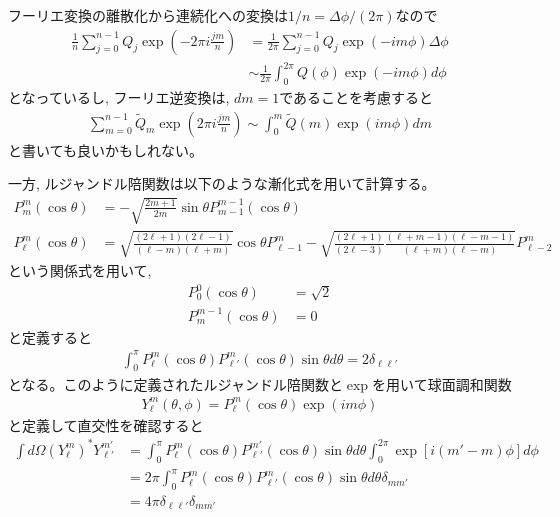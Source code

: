 \documentclass[a4j, 12pt]{ltjarticle}
\begin{document}
    フーリエ変換の離散化から連続化への変換は$1/n = \Delta \phi/(2\pi)$なので
    \begin{align}
        \frac{1}{n}\sum_{j=0}^{n-1}Q_j \exp\left(-2\pi i \frac{jm}{n}\right)
        &= \frac{1}{2\pi}\sum_{j=0}^{n-1}Q_j\exp\left(-im\phi \right) \Delta \phi \\
        &\sim \frac{1}{2\pi}\int_0^{2\pi} Q(\phi) \exp(-im\phi)d\phi
    \end{align}
    となっているし, フーリエ逆変換は, $dm = 1$であることを考慮すると
    \begin{align}
        \sum_{m=0}^{n-1}\tilde{Q}_m\exp\left(2\pi i \frac{jm}{n}\right) \sim
        \int_0^m \tilde{Q}(m) \exp\left(im\phi\right) dm
    \end{align}
    と書いても良いかもしれない。
    \par
    一方, ルジャンドル陪関数は以下のような漸化式を用いて計算する。
    \begin{align}
        P^m_m(\cos\theta) &= -\sqrt{\frac{2m+1}{2m}}\sin\theta P_{m-1}^{m-1}(\cos\theta) \\
        P^m_\ell (\cos\theta) &= \sqrt{\frac{(2\ell+1)(2\ell-1)}{(\ell - m)(\ell + m)}}\cos\theta P_{\ell-1}^m
        - \sqrt{\frac{(2\ell+1)}{(2\ell-3)}\frac{(\ell + m - 1)(\ell - m - 1)}{(\ell + m)(\ell - m)}}P_{\ell-2}^m
    \end{align}
    という関係式を用いて, 
    \begin{align}
        P_0^0(\cos\theta) &= \sqrt{2}\\
        P_m^{m-1}(\cos\theta) &= 0
    \end{align}
    と定義すると
    \begin{align}
        \int_0^\pi P_\ell^m(\cos\theta)P_{\ell'}^m(\cos\theta) \sin\theta d\theta = 2\delta_{\ell\ell'}
    \end{align}
    となる。このように定義されたルジャンドル陪関数と$\exp$を用いて球面調和関数
    \begin{align}
        Y_\ell^m(\theta,\phi) = P_\ell^m (\cos\theta)\exp(im\phi)
    \end{align}
    と定義して直交性を確認すると
    \begin{align}
        \int d\Omega (Y_\ell^m)^* Y_{\ell'}^{m'} &=
        \int_0^{\pi} P_\ell^m(\cos\theta)P_{\ell'}^{m'}(\cos\theta)\sin\theta d\theta 
        \int_0^{2\pi} \exp\left[i(m'-m)\phi\right] d\phi \\
        &= 2\pi\int_0^{\pi} P_\ell^m(\cos\theta)P_{\ell'}^{m}(\cos\theta)\sin\theta d\theta \delta_{mm'} \\
        & = 4\pi\delta_{\ell\ell'}\delta_{mm'}
    \end{align}
\end{document}
